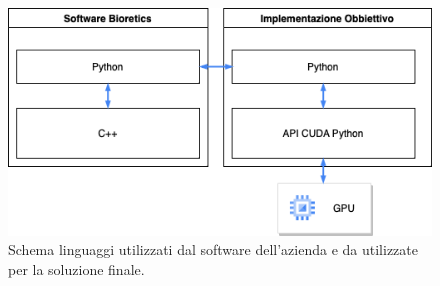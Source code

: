 \documentclass[12pt,a4paper]{report}
\begin{document}
\begin{figure}[H]
    \centering
    \includegraphics[scale=0.8]{img/Diagram_Python_GPU.drawio.png}
    \caption{Schema linguaggi utilizzati dal software dell'azienda e da utilizzate per la soluzione finale.}
\end{figure}
\end{document}
